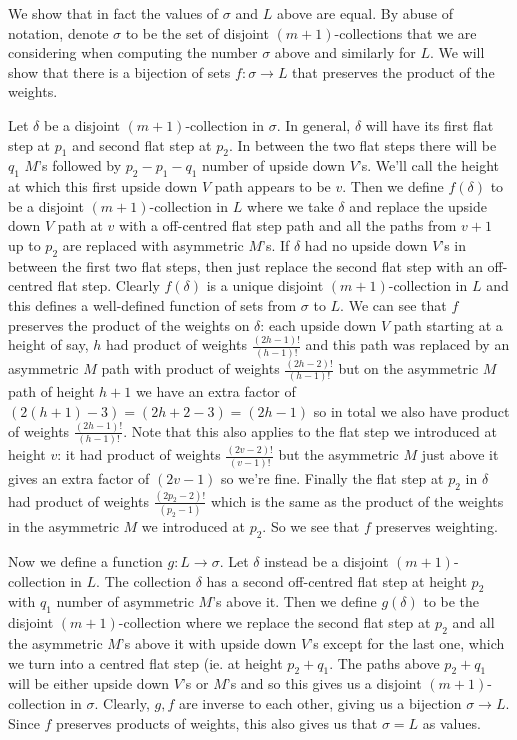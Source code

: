 \documentclass[11pt]{article}
\theoremstyle{definition}
\theoremstyle{definition}
\theoremstyle{plain}
\theoremstyle{plain}
\theoremstyle{plain}
\theoremstyle{definition}
\begin{document}
We show that in fact the values of $\sigma$ and $L$ above are equal. By abuse of notation, denote $\sigma$ to be the set of disjoint $(m+1)$-collections that we are considering when computing the number $\sigma$ above and similarly for $L$. We will show that there is a bijection of sets $f:\sigma \to L$ that preserves the product of the weights.

Let $\delta$ be a disjoint $(m+1)$-collection in $\sigma$. In general, $\delta$ will have its first flat step at $p_1$ and second flat step at $p_2$. In between the two flat steps there will be $q_1$ $M$'s followed by $p_2-p_1-q_1$ number of upside down $V$'s. We'll call the height at which this first upside down $V$ path appears to be $v$. Then we define $f(\delta)$ to be a disjoint $(m+1)$-collection in $L$ where we take $\delta$ and replace the upside down $V$ path at $v$ with a off-centred flat step path and all the paths from $v+1$ up to $p_2$ are replaced with asymmetric $M$'s. If $\delta$ had no upside down $V$'s in between the first two flat steps, then just replace the second flat step with an off-centred flat step. Clearly $f(\delta)$ is a unique disjoint $(m+1)$-collection in $L$ and this defines a well-defined function of sets from $\sigma$ to $L$. We can see that $f$ preserves the product of the weights on $\delta$: each upside down $V$ path starting at a height of say, $h$ had product of weights $\frac{(2h-1)!}{(h-1)!}$ and this path was replaced by an asymmetric $M$ path with product of weights $\frac{(2h-2)!}{(h-1)!}$ but on the asymmetric $M$ path of height $h+1$ we have an extra factor of $(2(h+1)-3) = (2h+2-3) = (2h-1)$ so in total we also have product of weights $\frac{(2h-1)!}{(h-1)!}$. Note that this also applies to the flat step we introduced at height $v$: it had product of weights $\frac{(2v-2)!}{(v-1)!}$ but the asymmetric $M$ just above it gives an extra factor of $(2v-1)$ so we're fine. Finally the flat step at $p_2$ in $\delta$ had product of weights $\frac{(2p_2-2)!}{(p_2-1)}$ which is the same as the product of the weights in the asymmetric $M$ we introduced at $p_2$. So we see that $f$ preserves weighting.

Now we define a function $g:L\to\sigma$. Let $\delta$ instead be a disjoint $(m+1)$-collection in $L$. The collection $\delta$ has a second off-centred flat step at height $p_2$ with $q_1$ number of asymmetric $M$'s above it. Then we define $g(\delta)$ to be the disjoint $(m+1)$-collection where we replace the second flat step at $p_2$ and all the asymmetric $M$'s above it with upside down $V$'s except for the last one, which we turn into a centred flat step (ie. at height $p_2+q_1$. The paths above $p_2+q_1$ will be either upside down $V$'s or $M$'s and so this gives us a disjoint $(m+1)$-collection in $\sigma$. Clearly, $g,f$ are inverse to each other, giving us a bijection $\sigma\to L$. Since $f$ preserves products of weights, this also gives us that $\sigma = L$ as values.
\end{document}
